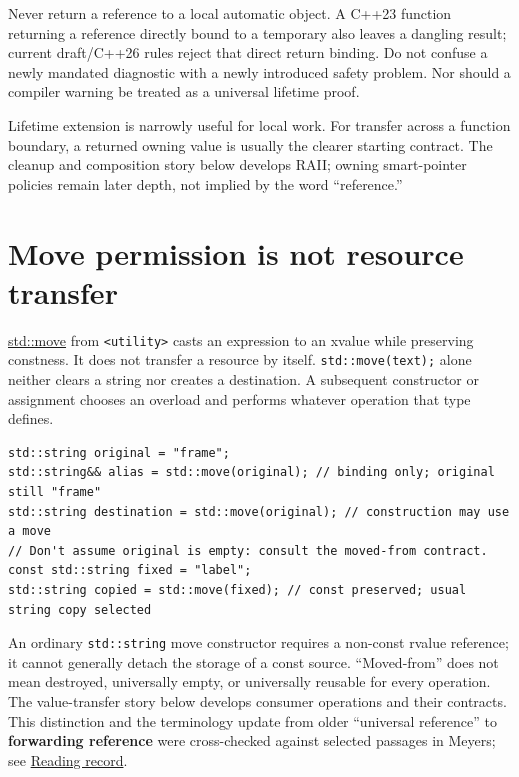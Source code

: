 Never return a reference to a local automatic object. A C++23 function returning a reference directly bound to a temporary also leaves a dangling result; current draft/C++26 rules reject that direct return binding. Do not confuse a newly mandated diagnostic with a newly introduced safety problem. Nor should a compiler warning be treated as a universal lifetime proof.

Lifetime extension is narrowly useful for local work. For transfer across a function boundary, a returned owning value is usually the clearer starting contract. The cleanup and composition story below develops RAII; owning smart-pointer policies remain later depth, not implied by the word ``reference.''

\section{Move permission is not resource transfer}\label{05-engine-i-ch003-move-permission-is-not-resource-transfer}

\hyperref[appendix-0104b704fb11]{std::move} from \texttt{\textless{}utility\textgreater{}} casts an expression to an xvalue while preserving constness. It does not transfer a resource by itself. \texttt{std::move(text);} alone neither clears a string nor creates a destination. A subsequent constructor or assignment chooses an overload and performs whatever operation that type defines.

\begin{verbatim}
std::string original = "frame";
std::string&& alias = std::move(original); // binding only; original still "frame"
std::string destination = std::move(original); // construction may use a move
// Don't assume original is empty: consult the moved-from contract.
const std::string fixed = "label";
std::string copied = std::move(fixed); // const preserved; usual string copy selected
\end{verbatim}

An ordinary \texttt{std::string} move constructor requires a non-const rvalue reference; it cannot generally detach the storage of a const source. ``Moved-from'' does not mean destroyed, universally empty, or universally reusable for every operation. The value-transfer story below develops consumer operations and their contracts. This distinction and the terminology update from older ``universal reference'' to \textbf{forwarding reference} were cross-checked against selected passages in Meyers; see \hyperref[appendix-a103e7846d21-m008---borrowing-categories-and-const-access]{Reading record}.

